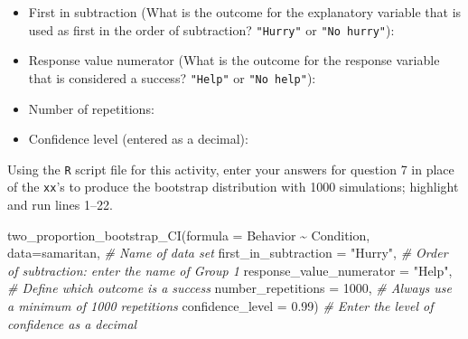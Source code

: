 \documentclass[
]{report}
\newenvironment{Shaded}{\begin{snugshade}}{\end{snugshade}}
\newcommand{\AttributeTok}[1]{\textcolor[rgb]{0.77,0.63,0.00}{#1}}
\newcommand{\CommentTok}[1]{\textcolor[rgb]{0.56,0.35,0.01}{\textit{#1}}}
\newcommand{\DecValTok}[1]{\textcolor[rgb]{0.00,0.00,0.81}{#1}}
\newcommand{\FloatTok}[1]{\textcolor[rgb]{0.00,0.00,0.81}{#1}}
\newcommand{\FunctionTok}[1]{\textcolor[rgb]{0.00,0.00,0.00}{#1}}
\newcommand{\NormalTok}[1]{#1}
\newcommand{\SpecialCharTok}[1]{\textcolor[rgb]{0.00,0.00,0.00}{#1}}
\newcommand{\StringTok}[1]{\textcolor[rgb]{0.31,0.60,0.02}{#1}}
\providecommand{\tightlist}{%
  \setlength{\itemsep}{0pt}\setlength{\parskip}{0pt}}
\begin{document}
\vspace{.5mm}

\begin{itemize}
\tightlist
\item
  First in subtraction (What is the outcome for the explanatory variable that is used as first in the order of subtraction? \texttt{"Hurry"} or \texttt{"No\ hurry"}):
\end{itemize}

\vspace{.2in}

\begin{itemize}
\tightlist
\item
  Response value numerator (What is the outcome for the response variable that is considered a success? \texttt{"Help"} or \texttt{"No\ help"}):
\end{itemize}

\vspace{.2in}

\begin{itemize}
\tightlist
\item
  Number of repetitions:
\end{itemize}

\vspace{.2in}

\begin{itemize}
\tightlist
\item
  Confidence level (entered as a decimal):
\end{itemize}

\vspace{.2in}

Using the \texttt{R} script file for this activity, enter your answers for question 7 in place of the \texttt{xx}'s to produce the bootstrap distribution with 1000 simulations; highlight and run lines 1--22.

\begin{Shaded}
\begin{Highlighting}[]
\FunctionTok{two\_proportion\_bootstrap\_CI}\NormalTok{(}\AttributeTok{formula =}\NormalTok{ Behavior }\SpecialCharTok{\textasciitilde{}}\NormalTok{ Condition, }
        \AttributeTok{data=}\NormalTok{samaritan, }\CommentTok{\# Name of data set}
        \AttributeTok{first\_in\_subtraction =} \StringTok{"Hurry"}\NormalTok{, }\CommentTok{\# Order of subtraction: enter the name of Group 1}
        \AttributeTok{response\_value\_numerator =} \StringTok{"Help"}\NormalTok{, }\CommentTok{\# Define which outcome is a success }
        \AttributeTok{number\_repetitions =} \DecValTok{1000}\NormalTok{, }\CommentTok{\# Always use a minimum of 1000 repetitions}
        \AttributeTok{confidence\_level =} \FloatTok{0.99}\NormalTok{) }\CommentTok{\# Enter the level of confidence as a decimal}
\end{Highlighting}
\end{Shaded}
\end{document}
